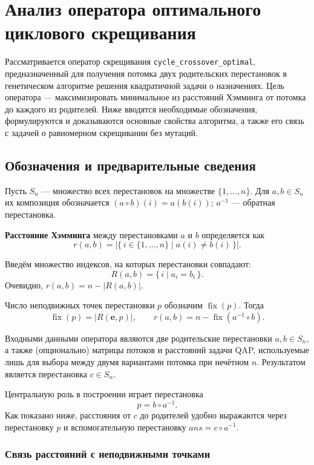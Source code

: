 \documentclass[732]{studrep}
\DeclareMathOperator{\fix}{fix}          %
\newcommand{\ans}{\mathit{ans}}          %
\newcommand{\id}{\mathbf{e}}
\theoremstyle{nonumberplain}
\begin{document}
\section{Анализ оператора оптимального циклового скрещивания}
\label{sec:crossover_analysis}

Рассматривается оператор скрещивания \texttt{cycle\_crossover\_optimal}, предназначенный для получения потомка двух родительских перестановок в генетическом алгоритме решения квадратичной задачи о назначениях. Цель оператора — максимизировать минимальное из расстояний Хэмминга от потомка до каждого из родителей. Ниже вводятся необходимые обозначения, формулируются и доказываются основные свойства алгоритма, а также его связь с задачей о равномерном скрещивании без мутаций.

\subsection{Обозначения и предварительные сведения}
\label{sec:notation}

Пусть $S_n$ — множество всех перестановок на множестве $\{1,\dots,n\}$.
Для $a,b\in S_n$ их композиция обозначается $(a\circ b)(i)=a(b(i))$; $a^{-1}$ — обратная перестановка.

\textbf{Расстояние Хэмминга} между перестановками $a$ и $b$ определяется как
\[
r(a,b) = \bigl|\{\,i\in\{1,\dots,n\}\mid a(i)\neq b(i)\,\}\bigr|.
\]

Введём множество индексов, на которых перестановки совпадают:
\[
R(a,b) = \{\,i \mid a_i = b_i \,\}.
\]
Очевидно, $r(a,b)=n-|R(a,b)|$.

Число неподвижных точек перестановки $p$ обозначим $\fix(p)$. Тогда
\[
\fix(p)=|R(\id,p)|,\qquad r(a,b)=n-\fix(a^{-1}\circ b).
\]

Входными данными оператора являются две родительские перестановки $a,b\in S_n$, а также (опционально) матрицы потоков и расстояний задачи QAP, используемые лишь для выбора между двумя вариантами потомка при нечётном $n$. Результатом является перестановка $c\in S_n$.

Центральную роль в построении играет перестановка
\[
p = b\circ a^{-1}.
\]
Как показано ниже, расстояния от $c$ до родителей удобно выражаются через перестановку $p$ и вспомогательную перестановку $\ans = c\circ a^{-1}$.

\subsubsection*{Связь расстояний с неподвижными точками}
\boxed{\ans = c\circ a^{-1}}
\end{document}
